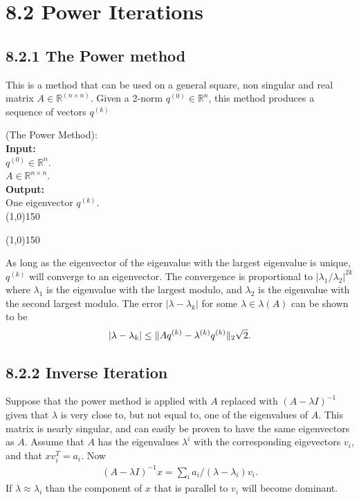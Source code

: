 \section*{8.2 Power Iterations}%

\subsection*{8.2.1 The Power method} %

This is a method that can be used on a general square, non singular and real matrix 
$A\in\mathbb R^{(n\times n)}$.
Given a 2-norm $q^{(0)}\in\mathbb R^n$, this method produces a sequence of vectors 
$q^{(k)}$
%
%
\begin{algo}
{
%
	(The Power Method):
%
}\\
\textbf{Input: }
{
%
	\\$q^{(0)}\in\mathbb R^n$.
	\\$A\in\mathbb R^{n\times n}$.
%
}\\
\textbf{Output: }
{
%
	\\One eigenvector $q^{(k)}$.
%
}\\
\line(1,0){150}
\begin{algorithmic}
%
\EndFor{}
%
\end{algorithmic}
\line(1,0){150}
\end{algo}
%
%
As long as the eigenvector of the eigenvalue with the largest eigenvalue is unique,
$q^{(k)}$ will converge to an eigenvector.
%
The convergence is proportional to $|\lambda_1/\lambda_2|^{2k}$ where $\lambda_1$ is the
eigenvalue with the largest modulo, and $\lambda_2$ is the eigenvalue with the second largest modulo.
%
The error $|\lambda - \lambda_k|$ for some $\lambda\in\lambda(A)$ can be shown to be
\begin{equation}
	|\lambda - \lambda_k| \le \lVert{Aq^{(k)} - \lambda^{(k)}q^{(k)}}\rVert_2\sqrt 2.
\end{equation}


\subsection*{8.2.2 Inverse Iteration} %

Suppose that the power method is applied with $A$ replaced with $(A-\lambda I)^{-1}$
given that $\lambda$ is very close to, but not equal to, one of the eigenvalues of $A$.
This matrix is nearly singular, and can easily be proven to have the same eigenvectors as $A$.
Assume that $A$ has the eigenvalues $\lambda^i$ with the corresponding eigevectors $v_i$, and that 
$xv_i^T = a_i$. Now
\begin{align}
	(A-\lambda I)^{-1}x = \sum_i a_i/(\lambda-\lambda_i) v_i.
\end{align}
If $\lambda\approx\lambda_i$ than the component of $x$ that is parallel to $v_i$
will become dominant.

